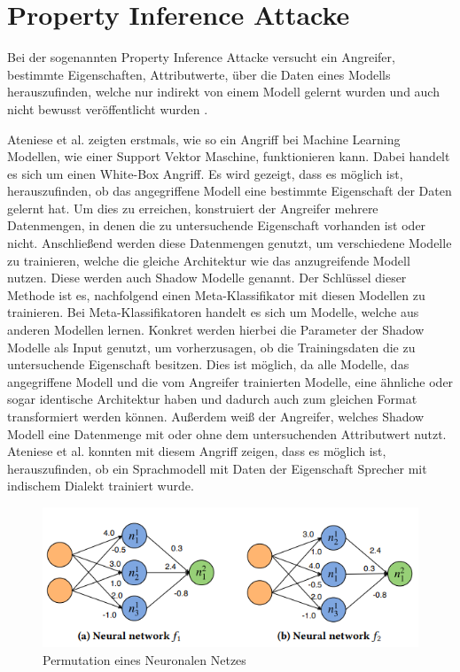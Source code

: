 \section{Property Inference Attacke}\label{sec:property_inference}

Bei der sogenannten Property Inference Attacke versucht ein Angreifer, bestimmte Eigenschaften, Attributwerte, über die Daten eines Modells herauszufinden, welche nur indirekt von einem Modell gelernt wurden und auch nicht bewusst veröffentlicht wurden \cite{P-80}.

Ateniese et al. \cite{P-80} zeigten erstmals, wie so ein Angriff bei Machine Learning Modellen, wie einer Support Vektor Maschine, funktionieren kann.
Dabei handelt es sich um einen White-Box Angriff.
Es wird gezeigt, dass es möglich ist, herauszufinden, ob das angegriffene Modell eine bestimmte Eigenschaft der Daten gelernt hat. 
Um dies zu erreichen, konstruiert der Angreifer mehrere Datenmengen, in denen die zu untersuchende Eigenschaft vorhanden ist oder nicht. 
Anschließend werden diese Datenmengen genutzt, um verschiedene Modelle zu trainieren, welche die gleiche Architektur wie das anzugreifende Modell nutzen.
Diese werden auch Shadow Modelle genannt.
Der Schlüssel dieser Methode ist es, nachfolgend einen Meta-Klassifikator mit diesen Modellen zu trainieren.
Bei Meta-Klassifikatoren handelt es sich um Modelle, welche aus anderen Modellen lernen. 
Konkret werden hierbei die Parameter der Shadow Modelle als Input genutzt, um vorherzusagen, ob die Trainingsdaten die zu untersuchende Eigenschaft besitzen. 
Dies ist möglich, da alle Modelle, das angegriffene Modell und die vom Angreifer trainierten Modelle, eine ähnliche oder sogar identische Architektur haben und dadurch auch zum gleichen Format transformiert werden können.
Außerdem weiß der Angreifer, welches Shadow Modell eine Datenmenge mit oder ohne dem untersuchenden Attributwert nutzt.
Ateniese et al. \cite{P-80} konnten mit diesem Angriff zeigen, dass es möglich ist, herauszufinden, ob ein Sprachmodell mit Daten der Eigenschaft \dq Sprecher mit indischem Dialekt \dq trainiert wurde. 

\begin{figure}[!htb]
    \centering
    \includegraphics[width=12cm]{figures/permutation_invariance}
    \caption{Permutation eines Neuronalen Netzes \cite{P-11}}
    \label{fig:permutation_invariance}
\end{figure} 

